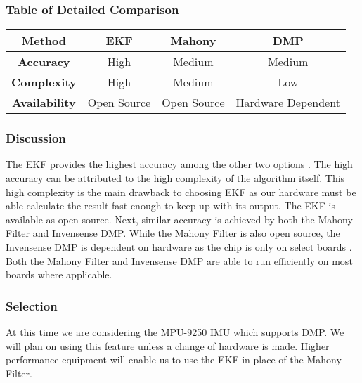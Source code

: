 \subsubsection{Table of Detailed Comparison}
\hfill \break
\begin{center}
\begin{tabular}{|c|c|c|c|}
\hline
\textbf{Method}       & \textbf{EKF} & \textbf{Mahony} & \textbf{DMP} 		\\ \hline
\textbf{Accuracy}     & High  		 & Medium          & Medium 			\\ \hline
\textbf{Complexity}   & High  		 & Medium          & Low				\\ \hline
\textbf{Availability} & Open Source  & Open Source     & Hardware Dependent	\\ \hline
\end{tabular}
\end{center}

\hfill \break
\subsubsection{Discussion}
The EKF provides the highest accuracy among the other two options \cite{EFK_MAHONY}.
The high accuracy can be attributed to the high complexity of the algorithm itself.
This high complexity is the main drawback to choosing EKF as our hardware must be able calculate the result fast enough to keep up with its output.
The EKF is available as open source. Next, similar accuracy is achieved by both the Mahony Filter and Invensense DMP.
While the Mahony Filter is also open source, the Invensense DMP is dependent on hardware as the chip is only on select boards \cite{MPU9250SDK}.
Both the Mahony Filter and Invensense DMP are able to run efficiently on most boards where applicable. \\

\subsubsection{Selection}
At this time we are considering the MPU-9250 IMU which supports DMP.
We will plan on using this feature unless a change of hardware is made.
Higher performance equipment will enable us to use the EKF in place of the Mahony Filter. \\
